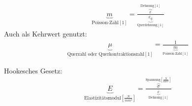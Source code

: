 \documentclass[11pt]{article}
\newcommand{\1}{ {\mathds{1}} }
\begin{document}
	\begin{align*}
		\underbrace{m}_{\text{Poisson-Zahl}[1]} = \frac{\overbrace{\varepsilon}^{\text{Dehnung} [1]}}{\underbrace{\varepsilon_q}_{\text{Querdehnung}[1]}}
	\end{align*}
	Auch als Kehrwert genutzt:
		\begin{align*}
		\underbrace{\mu}_{\text{Querzahl oder Querkontraktionszahl}[1]} = \frac{1}{\underbrace{m}_{\text{Poisson-Zahl}[1]}}
	\end{align*}
	\hrulefill
	
	Hookesches Gesetz:
	\begin{align*}
		\underbrace{E}_{\text{Elastizitätsmodul}\left[\frac{N}{mm^2}\right]}
		=
		\frac{\overbrace{\sigma}^{\text{Spannung}\left[\frac{N}{mm^2}\right]}}
		{\underbrace{\varepsilon}_{\text{Dehnung}\left[1\right]}}
	\end{align*}
	\hrulefill
	
\end{document}
